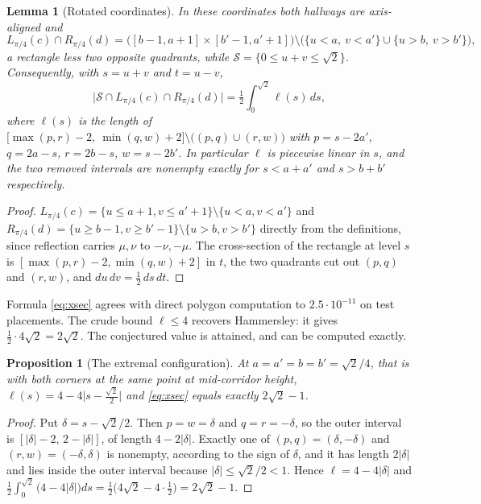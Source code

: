 \documentclass[11pt]{article}
\newtheorem{lemma}[theorem]{Lemma}
\newtheorem{proposition}[theorem]{Proposition}
\theoremstyle{definition}
\begin{document}
\begin{lemma}[Rotated coordinates]\label{lem:uv}
In these coordinates both hallways are axis-aligned and
\[
  L_{\pi/4}(c)\cap R_{\pi/4}(d)
  =\bigl([b-1,a+1]\times[b'-1,a'+1]\bigr)\setminus
   \bigl(\{u<a,\ v<a'\}\cup\{u>b,\ v>b'\}\bigr),
\]
a rectangle less two opposite quadrants, while $\mathcal S=\{0\le u+v\le\sqrt2\}$.
Consequently, with $s=u+v$ and $t=u-v$,
\begin{equation}\label{eq:xsec}
  \bigl|\mathcal S\cap L_{\pi/4}(c)\cap R_{\pi/4}(d)\bigr|
  =\tfrac12\int_0^{\sqrt2}\ell(s)\,ds ,
\end{equation}
where $\ell(s)$ is the length of
$\bigl[\max(p,r)-2,\ \min(q,w)+2\bigr]\setminus\bigl((p,q)\cup(r,w)\bigr)$ with
$p=s-2a'$, $q=2a-s$, $r=2b-s$, $w=s-2b'$. In particular $\ell$ is piecewise linear in
$s$, and the two removed intervals are nonempty exactly for $s<a+a'$ and $s>b+b'$
respectively.
\end{lemma}

\begin{proof}
$L_{\pi/4}(c)=\{u\le a+1,v\le a'+1\}\setminus\{u<a,v<a'\}$ and
$R_{\pi/4}(d)=\{u\ge b-1,v\ge b'-1\}\setminus\{u>b,v>b'\}$ directly from the definitions,
since reflection carries $\mu,\nu$ to $-\nu,-\mu$. The cross-section of the rectangle at
level $s$ is $[\max(p,r)-2,\min(q,w)+2]$ in $t$, the two quadrants cut out $(p,q)$ and
$(r,w)$, and $du\,dv=\tfrac12\,ds\,dt$.
\end{proof}

Formula \eqref{eq:xsec} agrees with direct polygon computation to $2.5\cdot10^{-11}$ on
test placements. The crude bound $\ell\le4$ recovers Hammersley: it gives
$\tfrac12\cdot4\sqrt2=2\sqrt2$. The conjectured value is attained, and can be computed
exactly.

\begin{proposition}[The extremal configuration]\label{prop:extremal}
At $a=a'=b=b'=\sqrt2/4$, that is with both corners at the same point at mid-corridor
height, $\ell(s)=4-4\bigl|s-\tfrac{\sqrt2}2\bigr|$ and \eqref{eq:xsec} equals exactly
$2\sqrt2-1$.
\end{proposition}

\begin{proof}
Put $\delta=s-\sqrt2/2$. Then $p=w=\delta$ and $q=r=-\delta$, so the outer interval is
$[|\delta|-2,\,2-|\delta|]$, of length $4-2|\delta|$. Exactly one of $(p,q)=(\delta,-\delta)$
and $(r,w)=(-\delta,\delta)$ is nonempty, according to the sign of $\delta$, and it has
length $2|\delta|$ and lies inside the outer interval because $|\delta|\le\sqrt2/2<1$.
Hence $\ell=4-4|\delta|$ and
$\tfrac12\int_0^{\sqrt2}\bigl(4-4|\delta|\bigr)ds=\tfrac12\bigl(4\sqrt2-4\cdot\tfrac12\bigr)
=2\sqrt2-1$.
\end{proof}
\end{document}
